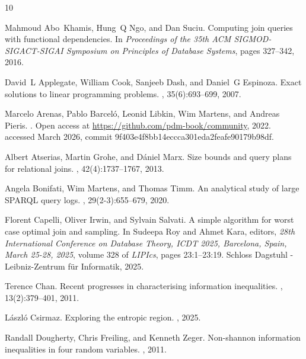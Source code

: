 \documentclass[a4paper,cleveref]{lipics-v2021}
\begin{document}

%
\begin{thebibliography}{10}

Mahmoud Abo~Khamis, Hung~Q Ngo, and Dan Suciu.
\newblock Computing join queries with functional dependencies.
\newblock In {\em Proceedings of the 35th ACM SIGMOD-SIGACT-SIGAI Symposium on
  Principles of Database Systems}, pages 327--342, 2016.

David~L Applegate, William Cook, Sanjeeb Dash, and Daniel~G Espinoza.
\newblock Exact solutions to linear programming problems.
, 35(6):693--699, 2007.

Marcelo Arenas, Pablo Barcel\'o, Leonid Libkin, Wim Martens, and Andreas
  Pieris.
.
\newblock Open access at \url{https://github.com/pdm-book/community}, 2022.
\newblock accessed March 2026, commit 9f403e4f8bb14eccca301eda2feafe90179b98df.

Albert Atserias, Martin Grohe, and D{\'a}niel Marx.
\newblock Size bounds and query plans for relational joins.
, 42(4):1737--1767, 2013.

Angela Bonifati, Wim Martens, and Thomas Timm.
\newblock An analytical study of large {SPARQL} query logs.
, 29(2-3):655--679, 2020.

Florent Capelli, Oliver Irwin, and Sylvain Salvati.
\newblock A simple algorithm for worst case optimal join and sampling.
\newblock In Sudeepa Roy and Ahmet Kara, editors, {\em 28th International
  Conference on Database Theory, {ICDT} 2025, Barcelona, Spain, March 25-28,
  2025}, volume 328 of {\em LIPIcs}, pages 23:1--23:19. Schloss Dagstuhl -
  Leibniz-Zentrum f{\"{u}}r Informatik, 2025.

Terence Chan.
\newblock Recent progresses in characterising information inequalities.
, 13(2):379--401, 2011.

L{\'a}szl{\'o} Csirmaz.
\newblock Exploring the entropic region.
, 2025.

Randall Dougherty, Chris Freiling, and Kenneth Zeger.
\newblock Non-shannon information inequalities in four random variables.
, 2011.


\end{thebibliography}
\end{document}

